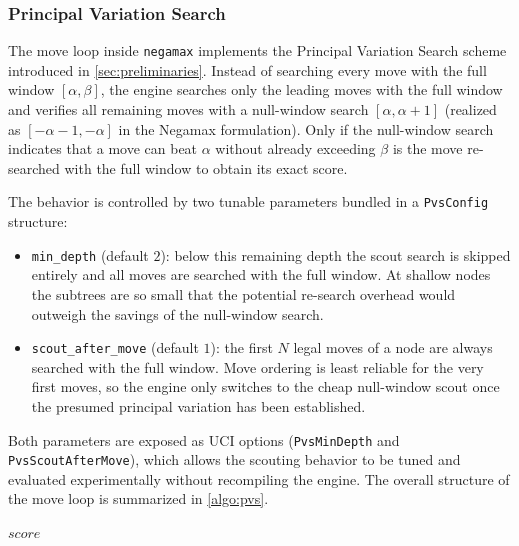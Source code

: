 \subsubsection{Principal Variation Search}
\label{subsec:pvs_implementation}

The move loop inside \texttt{negamax} implements the Principal Variation Search
scheme introduced in \cref{sec:preliminaries}. Instead of searching every move
with the full window $[\alpha, \beta]$, the engine searches only the leading
moves with the full window and verifies all remaining moves with a null-window
search $[\alpha, \alpha + 1]$ (realized as $[-\alpha - 1, -\alpha]$ in the
Negamax formulation). Only if the null-window search indicates that a move can
beat $\alpha$ without already exceeding $\beta$ is the move re-searched with
the full window to obtain its exact score.

The behavior is controlled by two tunable parameters bundled in a
\texttt{PvsConfig} structure:
\begin{itemize}
    \item \texttt{min\_depth} (default $2$): below this remaining depth the
    scout search is skipped entirely and all moves are searched with the full
    window. At shallow nodes the subtrees are so small that the potential
    re-search overhead would outweigh the savings of the null-window search.
    \item \texttt{scout\_after\_move} (default $1$): the first $N$ legal
    moves of a node are always searched with the full window. Move ordering is
    least reliable for the very first moves, so the engine only switches to the
    cheap null-window scout once the presumed principal variation has been
    established.
\end{itemize}

Both parameters are exposed as UCI options (\texttt{PvsMinDepth} and
\texttt{PvsScoutAfterMove}), which allows the scouting behavior to be tuned and
evaluated experimentally without recompiling the engine. The overall structure
of the move loop is summarized in \cref{algo:pvs}.

\begin{algorithm}[ht]
\DontPrintSemicolon
{}

\Return $score$\;
\caption{Principal Variation Search inside the Negamax move loop.}
\label{algo:pvs}
\end{algorithm}

